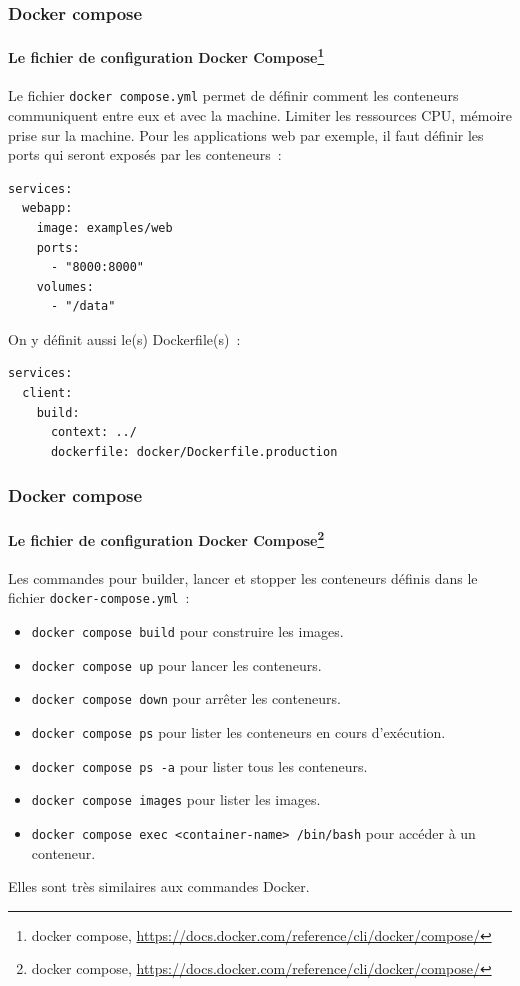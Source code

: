 \documentclass{beamer}
\begin{document}
    \begin{frame}[fragile]
        \transdissolve
        \frametitle{Docker compose}
        \framesubtitle{Le fichier de configuration Docker Compose\footnote{docker compose, \url{https://docs.docker.com/reference/cli/docker/compose/}}}
        Le fichier \lstinline{docker compose.yml} permet de définir comment les conteneurs communiquent entre eux et avec la machine.
        Limiter les ressources CPU, mémoire prise sur la machine.
        \bigbreak
        Pour les applications web par exemple, il faut définir les ports qui seront exposés par les conteneurs~:
        \begin{lstlisting}
services:
  webapp:
    image: examples/web
    ports:
      - "8000:8000"
    volumes:
      - "/data"
        \end{lstlisting}
        On y définit aussi le(s) Dockerfile(s)~:
        \begin{lstlisting}
services:
  client:
    build:
      context: ../
      dockerfile: docker/Dockerfile.production
        \end{lstlisting}
    \end{frame}

    \begin{frame}[fragile]
        \transdissolve
        \frametitle{Docker compose}
        \framesubtitle{Le fichier de configuration Docker Compose\footnote{docker compose, \url{https://docs.docker.com/reference/cli/docker/compose/}}}
        Les commandes pour builder, lancer et stopper les conteneurs définis dans le fichier \lstinline{docker-compose.yml}~:
        \begin{itemize}
            \item \lstinline{docker compose build} pour construire les images.
            \item \lstinline{docker compose up} pour lancer les conteneurs.
            \item \lstinline{docker compose down} pour arrêter les conteneurs.
            \item \lstinline{docker compose ps} pour lister les conteneurs en cours d'exécution.
            \item \lstinline{docker compose ps -a} pour lister tous les conteneurs.
            \item \lstinline{docker compose images} pour lister les images.
            \item \lstinline{docker compose exec <container-name> /bin/bash} pour accéder à un conteneur.
        \end{itemize}
        Elles sont très similaires aux commandes Docker.
    \end{frame}
\end{document}

